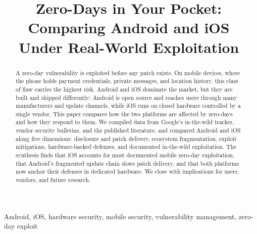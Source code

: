 \documentclass[conference,a4paper]{IEEEtran}
\begin{document}
\title{Zero-Days in Your Pocket: Comparing Android and iOS Under Real-World Exploitation}

\author{
}

\maketitle

\begin{abstract}
A zero-day vulnerability is exploited before any patch exists. On mobile
devices, where the phone holds payment credentials, private messages, and
location history, this class of flaw carries the highest risk. Android and
iOS dominate the market, but they are built and shipped differently: Android
is open source and reaches users through many manufacturers and update
channels, while iOS runs on closed hardware controlled by a single vendor.
This paper compares how the two platforms are affected by zero-days and how
they respond to them. We compiled data from Google's in-the-wild tracker,
vendor security bulletins, and the published literature, and compared Android
and iOS along five dimensions: disclosure and patch delivery, ecosystem
fragmentation, exploit mitigations, hardware-backed defenses, and documented
in-the-wild exploitation. The synthesis finds that iOS accounts for most
documented mobile zero-day exploitation, that Android's fragmented update
chain slows patch delivery, and that both platforms now anchor their defenses
in dedicated hardware. We close with implications for users, vendors, and
future research.
\end{abstract}

\begin{IEEEkeywords}
Android, iOS, hardware security, mobile security, vulnerability management, zero-day exploit
\end{IEEEkeywords}
\end{document}
